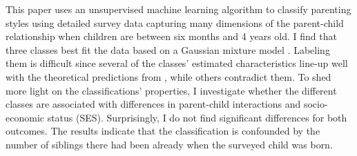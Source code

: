 This paper uses an unsupervised machine learning algorithm to classify parenting styles using detailed survey data capturing many dimensions of the parent-child relationship when children are between six months and 4 years old. I find that three classes best fit the data based on a Gaussian mixture model \parencite[e.g.][]{hastieElementsStatisticalLearning2009}. Labeling them is difficult since several of the classes' estimated characteristics line-up well with the theoretical predictions from \textcite{doepkeParentingStyleAltruism2017}, while others contradict them.
To shed more light on the classifications' properties, I investigate whether the different classes are associated with differences in parent-child interactions and socio-economic status (SES). Surprisingly, I do not find significant differences for both outcomes. The results indicate that the classification is confounded by the number of siblings there had been already when the surveyed child was born.



